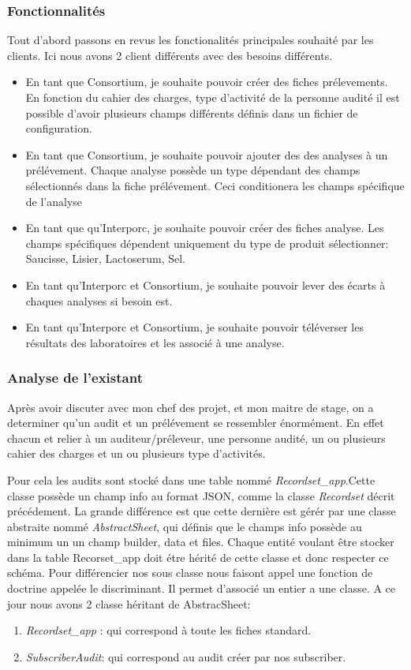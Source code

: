 \subsubsection{Fonctionnalités}
Tout d'abord passons en revus les fonctionalités principales souhaité par les clients. Ici nous avons 2 client différents avec des besoins différents.
\begin{itemize}
    \item En tant que Consortium, je souhaite pouvoir créer des fiches prélevements. En fonction du cahier des charges, type d'activité de la personne audité il est possible d'avoir plusieurs champs différents définis dans un fichier de configuration.
    \item En tant que Consortium, je souhaite pouvoir ajouter des des analyses à un prélévement. Chaque analyse possède un type dépendant des champs sélectionnés dans la fiche prélévement. Ceci conditionera les champs spécifique de l'analyse
    \item En tant que qu'Interporc, je souhaite pouvoir créer des fiches analyse. Les champs spécifiques dépendent uniquement du type de produit sélectionner: Saucisse, Lisier, Lactoserum, Sel. 
    \item En tant qu'Interporc et Consortium, je souhaite pouvoir lever des écarts à chaques analyses si besoin est.  
    \item En tant qu'Interporc et Consortium, je souhaite pouvoir téléverser les résultats des laboratoires et les associé à une analyse. 
\end{itemize}



\subsubsection{Analyse de l'existant}


Après avoir discuter avec mon chef des projet, et mon maitre de stage, on a determiner qu'un audit et un prélévement se ressembler énormément. En effet chacun et relier à un auditeur/préleveur, une personne audité, un ou plusieurs cahier des charges et un ou plusieurs type d'activités. 

Pour cela les audits sont stocké dans une table nommé \textit{Recordset\_app}.Cette classe possède un champ info au format JSON, comme la classe \textit{Recordset}  décrit précédement. La grande différence est que cette dernière est gérér par une classe abstraite nommé \textit{AbstractSheet}, qui définis que le champs info possède au minimum un un champ builder, data et files. Chaque entité voulant être stocker dans la table Recorset\_app doit étre hérité de cette classe et donc respecter ce schéma. Pour différencier nos sous classe nous faisont appel une fonction de doctrine appelée le discriminant. Il permet d'associé un entier a une classe. A ce jour nous avons 2 classe héritant de AbstracSheet: 
\begin{enumerate}
    \item \textit{Recordset\_app} : qui correspond à toute les fiches standard. 
    \item \textit{SubscriberAudit}: qui correspond au audit créer par nos subscriber. 
\end{enumerate}

